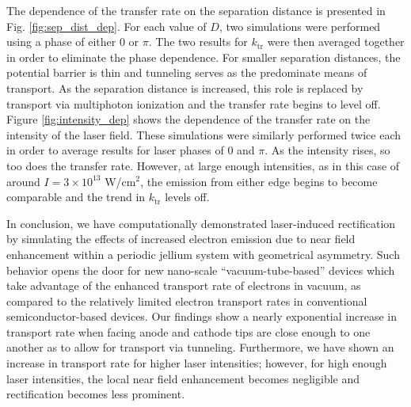 \documentclass[%
 reprint,
 amsmath,amssymb,
pra,
tightenlines
]{revtex4-1}
\begin{document}
The dependence of the transfer rate on the separation distance is presented in Fig. \ref{fig:sep_dist_dep}. For each value of $D$, two simulations were performed using a phase of either 0 or $\pi$. The two results for $k_\text{tr}$ were then averaged together in order to eliminate the phase dependence. For smaller separation distances, the potential barrier is thin and tunneling serves as the predominate means of transport. As the separation distance is increased, this role is replaced by transport via multiphoton ionization and the transfer rate begins to level off.   
Figure \ref{fig:intensity_dep} shows the dependence of the transfer rate on the intensity of the laser field. These simulations were similarly performed twice each in order to average results for laser phases of 0 and $\pi$. As the intensity rises, so too does the transfer rate. However, at large enough intensities, as in this case of around $I=3 \times 10^{13}$ W/$\text{cm}^2$, the emission from either edge begins to become comparable and the  trend in $k_\text{tr}$ levels off. 






In conclusion, we have computationally demonstrated laser-induced rectification by simulating the effects of increased electron emission due to near field enhancement within a periodic jellium system with geometrical asymmetry. Such behavior opens the door for new nano-scale ``vacuum-tube-based'' devices which take advantage of the enhanced transport rate of electrons in vacuum, as compared to the relatively limited electron transport rates in conventional semiconductor-based devices. Our findings show a nearly exponential increase in transport rate when facing anode and cathode tips are close enough to one another as to allow for transport via tunneling. Furthermore, we have shown an increase in transport rate for higher laser intensities; however, for high enough laser intensities, the local near field enhancement becomes negligible and rectification becomes less prominent.






\end{document}

